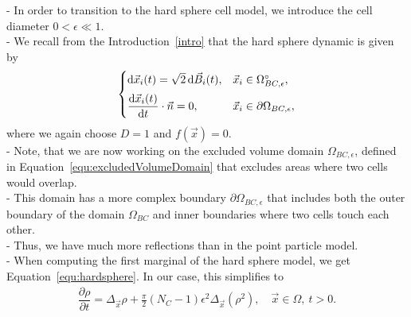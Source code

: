 - In order to transition to the hard sphere cell model, we introduce the cell diameter $0 < \epsilon \ll 1$. \\
- We recall from the Introduction~\ref{intro} that the hard sphere dynamic is given by
\begin{equation*}
    \begin{cases}
        \mathrm{d} \vec{x}_i(t) = \sqrt{2} \, \mathrm{d} \vec{B}_i(t), & \vec{x}_i \in \Omega_{BC, \epsilon}^{\circ}, \\[0.5em]
        \dfrac{\mathrm{d} \vec{x}_i(t)}{\mathrm{d} t} \cdot \vec{n} = 0, & \vec{x}_i \in \partial \Omega_{BC, \epsilon},
    \end{cases}
\end{equation*}
where we again choose $D = 1$ and $f(\vec{x}) = 0$.  \\
- Note, that we are now working on the excluded volume domain $\Omega_{BC, \epsilon}$, defined in Equation~\eqref{equ:excludedVolumeDomain} that excludes areas where two cells would overlap. \\ 
- This domain has a more complex boundary $\partial \Omega_{BC, \epsilon}$ that includes both the outer boundary of the domain $\Omega_{BC}$ and inner boundaries where two cells touch each other. \\  
- Thus, we have much more reflections than in the point particle model. \\
- When computing the first marginal of the hard sphere model, we get Equation~\eqref{equ:hardsphere}.
In our case, this simplifies to
\begin{align}
	\dfrac{\partial \rho}{\partial t} = \Delta_{\vec{x}} \rho + \frac{\pi}{2} (N_C - 1) \epsilon^2 \Delta_{\vec{x}} (\rho^2), \quad \vec{x} \in \Omega, \: t>0 . 
    \label{equ:marginalHSCM}
\end{align}


